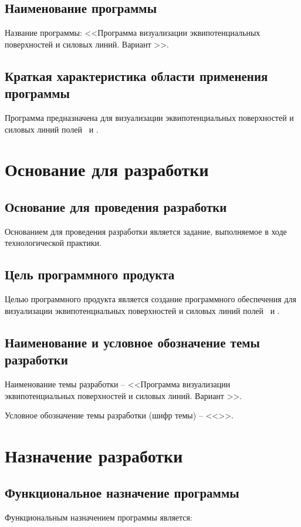 \documentclass[14pt,a4paper,final]{extreport}
\begin{document}
\section{Наименование программы}
Название программы: <<Программа визуализации эквипотенциальных поверхностей и силовых линий. Вариант \variant>>.

\section{Краткая характеристика области применения программы}
Программа предназначена для визуализации эквипотенциальных поверхностей и силовых линий полей \fieldA\ и \fieldB.

\chapter{Основание для разработки}

\section{Основание для проведения разработки}
Основанием для проведения разработки является задание, выполняемое в ходе технологической практики.

\section{Цель программного продукта}
Целью программного продукта является создание программного обеспечения для визуализации эквипотенциальных поверхностей и силовых линий полей \fieldA\ и \fieldB .

\section{Наименование и условное обозначение темы разработки}
Наименование темы разработки -- <<Программа визуализации эквипотенциальных поверхностей и силовых линий. Вариант \variant>>.

Условное обозначение темы разработки (шифр темы) -- <<\cipher>>.

\chapter{Назначение разработки}

\section{Функциональное назначение программы}
Функциональным назначением программы является: 
\end{document}
